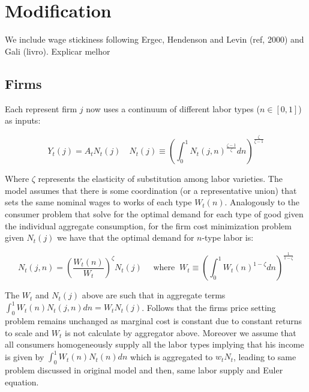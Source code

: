 \documentclass{article}
\begin{document}
\begin{figure}[H]
\centering


\end{figure}

\section{Modification}
We include wage stickiness following Ergec, Hendenson and Levin (ref, 2000) and Gali (livro). Explicar melhor

\subsection{Firms}
Each represent firm $j$ now uses a continuum of different labor types ($n \in [0,1]$) as inputs:

\begin{equation}
    Y_t(j) = A_t N_t(j) \quad N_t(j) \equiv \left( \int^1_0 N_t(j, n)^{\frac{\zeta-1}{\zeta}} dn \right)^{\frac{\zeta}{\zeta-1}}
\end{equation}

Where $\zeta$ represents the elasticity of substitution among labor varieties. The model assumes that there is some coordination (or a representative union) that sets the same nominal wages to works of each type $W_t(n)$. Analogously to the consumer problem that solve for the optimal demand for each type of good given the individual aggregate consumption, for the firm cost minimization problem given $N_t(j)$ we have that the optimal demand for $n$-type labor is:

\begin{equation}
    N_t(j,n) = \left(\frac{W_t(n)}{W_t} \right)^\zeta N_t(j) \quad \textrm{ where } \ W_t \equiv \left(\int^1_0 W_t(n)^{1-\zeta} dn \right)^{\frac{1}{1-\zeta}}
\end{equation}

The $W_t$ and $N_t(j)$ above are such that in aggregate terms $\int^1_0 W_t(n) N_t(j,n) dn = W_t N_t(j)$. Follows that the firms price setting problem remains unchanged as marginal cost is constant due to constant returns to scale and $W_t$ is not calculate by aggregator above. Moreover we assume that all consumers homogeneously supply all the labor types implying that his income is given by $\int^1_0 W_t(n) N_t(n) dn$ which is aggregated to $w_t N_t$, leading to same problem discussed in original model and then, same labor supply and Euler equation.\\
\end{document}
